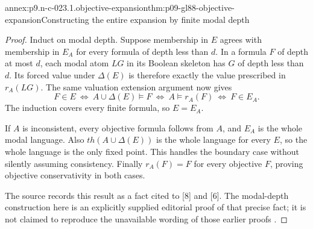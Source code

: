\begin{annexitem}{annex:p9.n-c-023.1.objective-expansion}{thm:p09-gl88-objective-expansion}{Constructing the entire expansion by finite modal depth}
\begin{proof}
Induct on modal depth.  Suppose membership in \(E\) agrees with membership
in \(E_A\) for every formula of depth less than \(d\).  In a formula
\(F\) of depth at most \(d\), each modal atom \(LG\) in its Boolean
skeleton has \(G\) of depth less than \(d\).  Its forced value under
\(\Delta(E)\) is therefore exactly the value prescribed in
\(r_A(LG)\).  The same valuation extension argument now gives
\[
 F\in E
 \ \Longleftrightarrow\ A\cup\Delta(E)\models F
 \ \Longleftrightarrow\ A\models r_A(F)
 \ \Longleftrightarrow\ F\in E_A.
\]
The induction covers every finite formula, so \(E=E_A\).

If \(A\) is inconsistent, every objective formula follows from \(A\),
and \(E_A\) is the whole modal language.  Also
\(th(A\cup\Delta(E))\) is the whole language for every \(E\), so the
whole language is the only fixed point.  This handles the boundary case
without silently assuming consistency.  Finally \(r_A(F)=F\) for every
objective \(F\), proving objective conservativity in both cases.

The source records this result as a fact cited to [8] and [6].  The
modal-depth construction here is an explicitly supplied editorial proof of
that precise fact; it is not claimed to reproduce the unavailable wording
of those earlier proofs \cite[\S4, p.~8]{GelfondLifschitz1988}.
\end{proof}
\end{annexitem}

